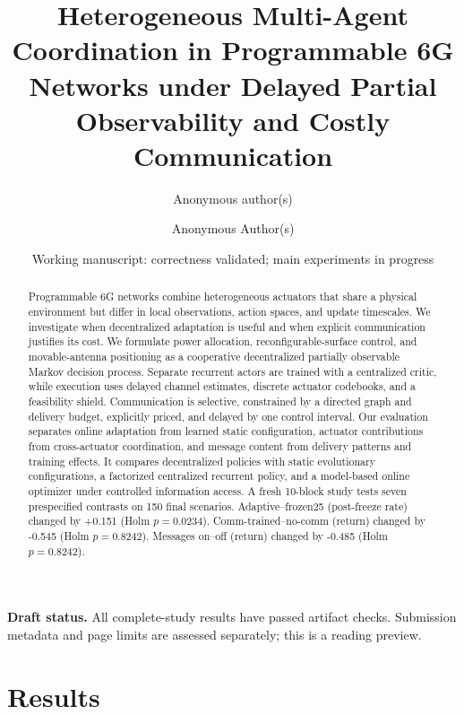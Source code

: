 \documentclass[10pt,letterpaper]{article}
\title{Heterogeneous Multi-Agent Coordination in Programmable 6G Networks under Delayed Partial Observability and Costly Communication}
\author{Anonymous author(s)}
\date{Working manuscript: correctness validated; main experiments in progress}
\author{Anonymous Author(s)}
\affiliation{\institution{Submitted for double-blind review}\country{}}
\begin{document}
\ifdefined\previewmode\maketitle\fi
\begin{abstract}
Programmable 6G networks combine heterogeneous actuators that share a physical environment but differ in local observations, action spaces, and update timescales. We investigate when decentralized adaptation is useful and when explicit communication justifies its cost. We formulate power allocation, reconfigurable-surface control, and movable-antenna positioning as a cooperative decentralized partially observable Markov decision process. Separate recurrent actors are trained with a centralized critic, while execution uses delayed channel estimates, discrete actuator codebooks, and a feasibility shield. Communication is selective, constrained by a directed graph and delivery budget, explicitly priced, and delayed by one control interval. Our evaluation separates online adaptation from learned static configuration, actuator contributions from cross-actuator coordination, and message content from delivery patterns and training effects. It compares decentralized policies with static evolutionary configurations, a factorized centralized recurrent policy, and a model-based online optimizer under controlled information access. A fresh 10-block study tests seven prespecified contrasts on 150 final scenarios. Adaptive--frozen25 (post-freeze rate) changed by +0.151 (Holm $p=0.0234$). Comm-trained--no-comm (return) changed by -0.545 (Holm $p=0.8242$). Messages on--off (return) changed by -0.485 (Holm $p=0.8242$).
\end{abstract}
\ifdefined\previewmode
\noindent\textbf{Draft status.} All complete-study results have passed artifact checks. Submission metadata and page limits are assessed separately; this is a reading preview.
\else
{}
\maketitle
\fi



\section{Results}
\label{sec:results}

\end{document}
